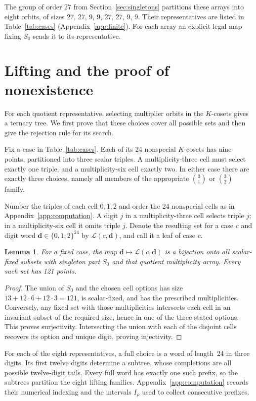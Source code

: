 \documentclass[11pt]{article}
\newtheorem{lemma}{Lemma}
\begin{document}
The group of order 27 from Section~\ref{sec:singletons} partitions
these arrays into eight orbits, of sizes 27, 27, 9, 9, 27, 27, 9, 9.
Their representatives are listed in Table~\ref{tab:cases}
(Appendix~\ref{app:finite}). For each array an explicit legal map
fixing $S_0$ sends it to its representative.

\section{Lifting and the proof of nonexistence}\label{sec:lifting}

For each quotient representative, selecting multiplier orbits in the
$K$-cosets gives a ternary tree. We first prove that these choices cover
all possible sets and then give the rejection rule for its search.

Fix a case in Table~\ref{tab:cases}. Each of its 24
nonspecial $K$-cosets has nine points, partitioned into
three scalar triples. A multiplicity-three cell must
select exactly one triple, and a multiplicity-six cell
exactly two. In either case there are exactly three
choices, namely all members of the appropriate
$\binom31$ or $\binom32$ family.

Number the triples of each cell $0,1,2$ and order the 24 nonspecial
cells as in Appendix~\ref{app:computation}. A digit $j$ in a
multiplicity-three cell selects triple $j$; in a multiplicity-six cell
it omits triple $j$. Denote the resulting set for a case $c$ and digit
word $\boldsymbol d\in\{0,1,2\}^{24}$ by $\mathcal L(c,\boldsymbol d)$,
and call it a leaf of case $c$.

\begin{lemma}\label{lem:lifting}
For a fixed case, the map $\boldsymbol d\mapsto
\mathcal L(c,\boldsymbol d)$ is a bijection onto all
scalar-fixed subsets with singleton part $S_0$ and that
quotient multiplicity array. Every such set has 121 points.
\end{lemma}
\begin{proof}
The union of $S_0$ and the chosen cell options has size
$13+12\cdot6+12\cdot3=121$, is scalar-fixed, and has
the prescribed multiplicities. Conversely, any fixed
set with those multiplicities intersects each cell
in an invariant subset of the required size, hence
in one of the three stated options. This proves
surjectivity. Intersecting the union with each of
the disjoint cells recovers its option and unique
digit, proving injectivity.
\end{proof}

For each of the eight representatives, a full choice is a word of
length~24 in three digits. Its first twelve digits determine a subtree,
whose completions are all possible twelve-digit tails. Every full word
has exactly one such prefix, so the subtrees partition the eight
lifting families. Appendix~\ref{app:computation} records their numerical
indexing and the intervals $I_\rho$ used to collect consecutive prefixes.
\end{document}

